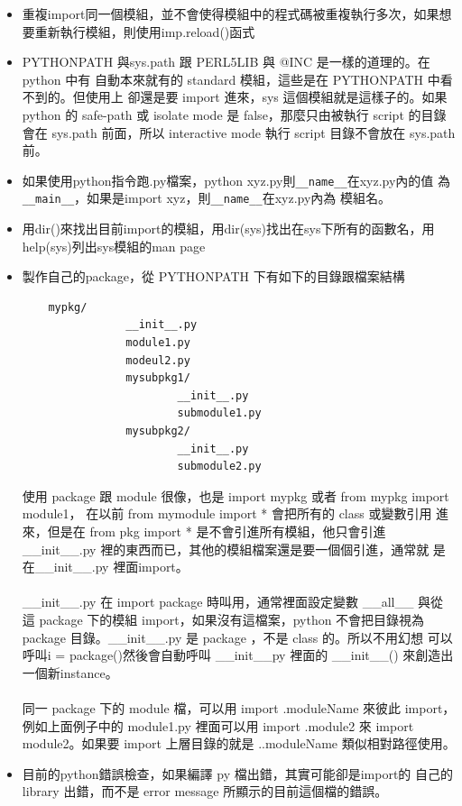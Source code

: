 \begin{itemize}
        除非確定完全沒有同名的symbol。
\item 重複import同一個模組，並不會使得模組中的程式碼被重複執行多次，如果想
	要重新執行模組，則使用imp.reload()函式
\item PYTHONPATH 與sys.path 跟 PERL5LIB 與 @INC 是一樣的道理的。在 python 中有
        自動本來就有的 standard 模組，這些是在 PYTHONPATH 中看不到的。但使用上
        卻還是要 import 進來，sys 這個模組就是這樣子的。如果 python 的
        safe-path 或 isolate mode 是 false，那麼只由被執行 script 的目錄會在
        sys.path 前面，所以 interactive mode 執行 script 目錄不會放在 sys.path
        前。
\item 如果使用python指令跑.py檔案，python xyz.py則\verb=__name__=在xyz.py內的值
	為\verb=__main__=，如果是import xyz，則\verb=__name__=在xyz.py內為
	模組名。
\item 用dir()來找出目前import的模組，用dir(sys)找出在sys下所有的函數名，用
	help(sys)列出sys模組的man page
\item 製作自己的package，從 PYTHONPATH 下有如下的目錄跟檔案結構
	\begin{verbatim}
	mypkg/
                __init__.py
                module1.py
                modeul2.py
                mysubpkg1/
                        __init__.py
                        submodule1.py
                mysubpkg2/
                        __init__.py
                        submodule2.py
	\end{verbatim}
	使用 package 跟 module 很像，也是 import mypkg 或者 from mypkg import
        module1， 在以前 from mymodule import * 會把所有的 class 或變數引用
        進來，但是在 from pkg import * 是不會引進所有模組，他只會引進
        \_\_init\_\_.py 裡的東西而已，其他的模組檔案還是要一個個引進，通常就
        是在\_\_init\_\_.py 裡面import。
	\\\\
	\_\_init\_\_.py 在 import package 時叫用，通常裡面設定變數 \_\_all\_\_
	與從這 package 下的模組 import，如果沒有這檔案，python 不會把目錄視為
	package 目錄。\_\_init\_\_.py 是 package ，不是 class 的。所以不用幻想
        可以呼叫i = package()然後會自動呼叫 \_\_init\_\_py 裡面的 \_\_init\_\_()
        來創造出一個新instance。
        \\\\
        同一 package 下的 module 檔，可以用 import .moduleName 來彼此 import，
        例如上面例子中的 module1.py 裡面可以用 import .module2 來 import 
        module2。如果要 import 上層目錄的就是 ..moduleName 類似相對路徑使用。
\item 目前的python錯誤檢查，如果編譯 py 檔出錯，其實可能卻是import的
  自己的 library 出錯，而不是 error message 所顯示的目前這個檔的錯誤。
\end{itemize}
